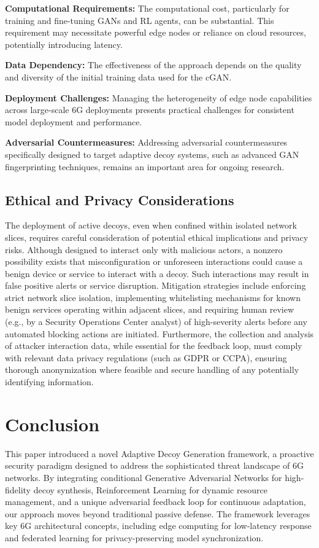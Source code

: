 \documentclass{article}
\begin{document}
\textbf{Computational Requirements:} The computational cost, particularly for training and fine-tuning GANs and RL agents, can be substantial. This requirement may necessitate powerful edge nodes or reliance on cloud resources, potentially introducing latency.

\textbf{Data Dependency:} The effectiveness of the approach depends on the quality and diversity of the initial training data used for the cGAN.

\textbf{Deployment Challenges:} Managing the heterogeneity of edge node capabilities across large-scale 6G deployments presents practical challenges for consistent model deployment and performance.

\textbf{Adversarial Countermeasures:} Addressing adversarial countermeasures specifically designed to target adaptive decoy systems, such as advanced GAN fingerprinting techniques, remains an important area for ongoing research.

\subsection*{Ethical and Privacy Considerations}

The deployment of active decoys, even when confined within isolated network slices, requires careful consideration of potential ethical implications and privacy risks. Although designed to interact only with malicious actors, a nonzero possibility exists that misconfiguration or unforeseen interactions could cause a benign device or service to interact with a decoy. Such interactions may result in false positive alerts or service disruption. Mitigation strategies include enforcing strict network slice isolation, implementing whitelisting mechanisms for known benign services operating within adjacent slices, and requiring human review (e.g., by a Security Operations Center analyst) of high-severity alerts before any automated blocking actions are initiated. Furthermore, the collection and analysis of attacker interaction data, while essential for the feedback loop, must comply with relevant data privacy regulations (such as GDPR or CCPA), ensuring thorough anonymization where feasible and secure handling of any potentially identifying information.

\section{Conclusion}

This paper introduced a novel Adaptive Decoy Generation framework, a proactive security paradigm designed to address the sophisticated threat landscape of 6G networks. By integrating conditional Generative Adversarial Networks for high-fidelity decoy synthesis, Reinforcement Learning for dynamic resource management, and a unique adversarial feedback loop for continuous adaptation, our approach moves beyond traditional passive defense. The framework leverages key 6G architectural concepts, including edge computing for low-latency response and federated learning for privacy-preserving model synchronization.
\end{document}
